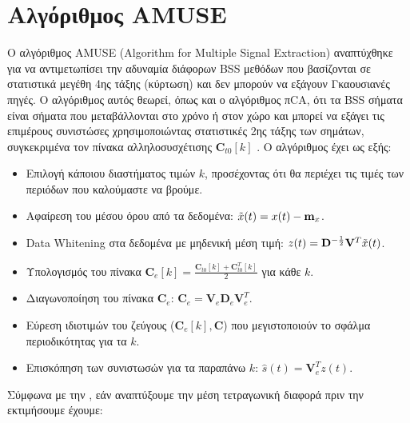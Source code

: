 \section{Αλγόριθμος AMUSE}
\justifying
O αλγόριθμος AMUSE (Algorithm for Multiple Signal Extraction) \cite{amuse:13} αναπτύχθηκε για να αντιμετωπίσει την αδυναμία διάφορων BSS μεθόδων που βασίζονται σε στατιστικά μεγέθη 4ης τάξης (κύρτωση) και δεν μπορούν να εξάγουν Γκαουσιανές πηγές. Ο αλγόριθμος αυτός θεωρεί, όπως και ο αλγόριθμος πCA, ότι τα BSS σήματα είναι σήματα που μεταβάλλονται στο χρόνο ή στον χώρο και μπορεί να εξάγει τις επιμέρους συνιστώσες χρησιμοποιώντας στατιστικές 2ης τάξης των σημάτων, συγκεκριμένα τον πίνακα αλληλοσυσχέτισης $\mathbf{C}_{t0}[k]$ \cite{piCA:14}.
Ο αλγόριθμος έχει ως εξής:
\begin{itemize}
    \item Επιλογή κάποιου διαστήματος τιμών $k$, προσέχοντας ότι θα περιέχει τις τιμές των περιόδων που καλούμαστε να βρούμε. 
    \item Αφαίρεση του μέσου όρου από τα δεδομένα: $\Tilde{x}(t) = x(t) - \mathbf{m}_x$.
    \item Data Whitening στα δεδομένα με μηδενική μέση τιμή: 
    $z(t) = \mathbf{D}^{-\frac{1}{2}} \mathbf{V}^T \Tilde{x}(t)$.
    \item Υπολογισμός του πίνακα $\mathbf{C}_e[k] = \frac{\mathbf{C}_{t0}[k]+\mathbf{C}_{t0}^T[k]} {2} $ για κάθε $k$.
    \item Διαγωνοποίηση του πίνακα $\mathbf{C}_e$: $\mathbf{C}_e = \mathbf{V}_e \mathbf{D}_e \mathbf{V}_e^T$.
    \item Εύρεση ιδιοτιμών του ζεύγους ($\mathbf{C}_e[k],\mathbf{C}$) που μεγιστοποιούν το σφάλμα περιοδικότητας για τα $k$.
    \item Επισκόπηση των συνιστωσών για τα παραπάνω $k$: $\hat{s}(t) = \mathbf{V}_e^T z(t)$. 
\end{itemize}
Σύμφωνα με την \cite{piCA:14}, εάν αναπτύξουμε την μέση τετραγωνική διαφορά πριν την εκτιμήσουμε έχουμε:
